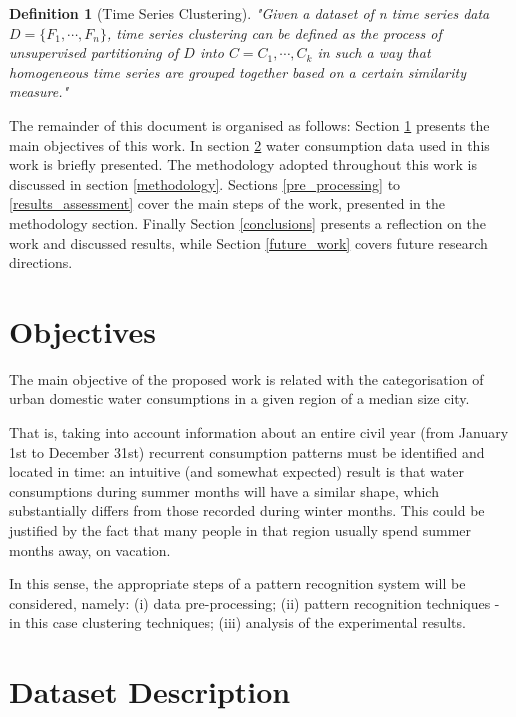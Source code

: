 \documentclass[9pt,journal,compsoc]{IEEEtran}
\newtheorem{mydef}{Definition}
\begin{document}
\begin{mydef}[Time Series Clustering]
	"Given a dataset of n time series data $D = \{F_{1}, \cdots , F_{n}\}$, time series clustering can be defined as the process of unsupervised partitioning of $D$ into $C = {C_{1}, \cdots , C_{k}}$ in such a way that homogeneous time series are grouped together based on a certain similarity measure."
\end{mydef}

The remainder of this document is organised as follows: Section \ref{objectives} presents the main objectives of this work. In section \ref{dataset_description} water consumption data used in this work is briefly presented. The methodology adopted throughout this work is discussed in section \ref{methodology}. Sections \ref{pre_processing} to \ref{results_assessment} cover the main steps of the work, presented in the methodology section. Finally Section \ref{conclusions} presents a reflection on the work and discussed results, while Section \ref{future_work} covers future research directions.

\section{Objectives}
\label{objectives}

The main objective of the proposed work is related with the categorisation of urban domestic water consumptions in a given region of a median size city.

That is, taking into account information about an entire civil year (from January 1st to December 31st) recurrent consumption patterns must be identified and located in time: an intuitive (and somewhat expected) result is that water consumptions during summer months will have a similar shape, which substantially differs from those recorded during winter months. This could be justified by the fact that many people in that region usually spend summer months away, on vacation.

In this sense, the appropriate steps of a pattern recognition system will be considered, namely: (i) data pre-processing; (ii) pattern recognition techniques - in this case clustering techniques; (iii) analysis of the experimental results.

\section{Dataset Description}
\label{dataset_description}
\end{document}
